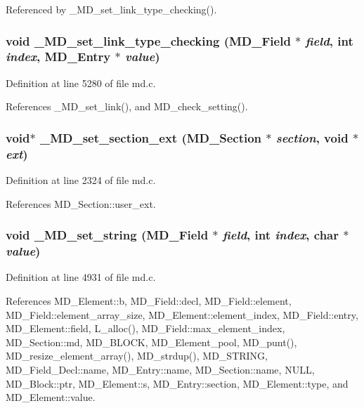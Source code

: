 Referenced by \_\-MD\_\-set\_\-link\_\-type\_\-checking().
\subsubsection{\setlength{\rightskip}{0pt plus 5cm}void \_\-MD\_\-set\_\-link\_\-type\_\-checking (\bf{MD\_\-Field} $\ast$ {\em field}, int {\em index}, \bf{MD\_\-Entry} $\ast$ {\em value})}\label{md_8h_70b4137a6c4c120aeaab956c4eba9788}




Definition at line 5280 of file md.c.

References \_\-MD\_\-set\_\-link(), and MD\_\-check\_\-setting().
\subsubsection{\setlength{\rightskip}{0pt plus 5cm}void$\ast$ \_\-MD\_\-set\_\-section\_\-ext (\bf{MD\_\-Section} $\ast$ {\em section}, void $\ast$ {\em ext})}\label{md_8h_c741671ef8a14e97c76a08ae4aaea7a6}




Definition at line 2324 of file md.c.

References MD\_\-Section::user\_\-ext.
\subsubsection{\setlength{\rightskip}{0pt plus 5cm}void \_\-MD\_\-set\_\-string (\bf{MD\_\-Field} $\ast$ {\em field}, int {\em index}, char $\ast$ {\em value})}\label{md_8h_58dfee0212f8877f158eefeddd2490fd}




Definition at line 4931 of file md.c.

References MD\_\-Element::b, MD\_\-Field::decl, MD\_\-Field::element, MD\_\-Field::element\_\-array\_\-size, MD\_\-Element::element\_\-index, MD\_\-Field::entry, MD\_\-Element::field, L\_\-alloc(), MD\_\-Field::max\_\-element\_\-index, MD\_\-Section::md, MD\_\-BLOCK, MD\_\-Element\_\-pool, MD\_\-punt(), MD\_\-resize\_\-element\_\-array(), MD\_\-strdup(), MD\_\-STRING, MD\_\-Field\_\-Decl::name, MD\_\-Entry::name, MD\_\-Section::name, NULL, MD\_\-Block::ptr, MD\_\-Element::s, MD\_\-Entry::section, MD\_\-Element::type, and MD\_\-Element::value.

